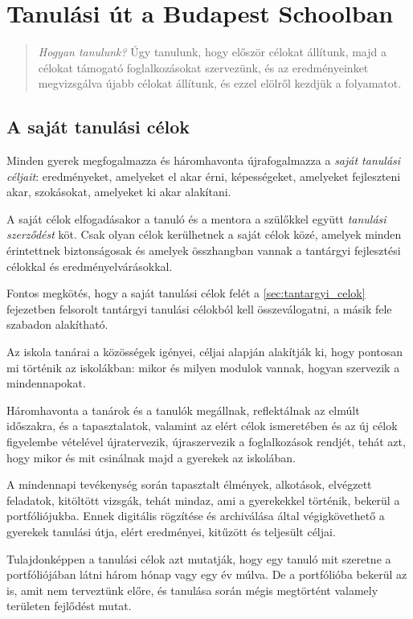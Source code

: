\chapter{Tanulási út a Budapest Schoolban}

\begin{quote}
\emph{Hogyan tanulunk?}
Úgy tanulunk, hogy először célokat állítunk, majd a célokat támogató
foglalkozásokat szervezünk, és az eredményeinket megvizsgálva újabb
célokat állítunk, és ezzel elölről kezdjük a folyamatot.
\end{quote}

\section{A saját tanulási célok}

Minden gyerek megfogalmazza és háromhavonta újrafogalmazza a \emph{saját tanulási céljait}: eredményeket, amelyeket el akar érni, képességeket, amelyeket fejleszteni akar, szokásokat, amelyeket ki akar alakítani.

A saját célok elfogadásakor a tanuló és a mentora a szülőkkel együtt \emph{tanulási szerződést} köt. Csak olyan célok kerülhetnek a saját célok közé, amelyek minden érintettnek biztonságosak és amelyek összhangban vannak a tantárgyi fejlesztési célokkal és eredményelvárásokkal.

Fontos megkötés, hogy a saját tanulási célok felét a \ref{sec:tantargyi_celok} fejezetben felsorolt tantárgyi tanulási célokból kell összeválogatni, a másik fele szabadon alakítható.

Az iskola tanárai a közösségek igényei, céljai alapján alakítják ki, hogy pontosan mi történik az iskolákban: mikor és milyen modulok vannak, hogyan szervezik a mindennapokat.

Háromhavonta a tanárok és a tanulók megállnak, reflektálnak az elmúlt időszakra, és a tapasztalatok, valamint az elért célok ismeretében és az új célok figyelembe vételével újratervezik, újraszervezik a foglalkozások rendjét, tehát azt, hogy mikor és mit csinálnak majd a gyerekek az iskolában.

A mindennapi tevékenység során tapasztalt élmények, alkotások, elvégzett feladatok, kitöltött vizsgák, tehát mindaz, ami a gyerekekkel történik, bekerül a portfóliójukba. Ennek digitális rögzítése és archiválása által végigkövethető a gyerekek tanulási útja, elért eredményei, kitűzött és teljesült céljai.

Tulajdonképpen a tanulási célok azt mutatják, hogy egy tanuló mit szeretne a portfóliójában látni három hónap vagy egy év múlva. De a portfólióba bekerül az is, amit nem terveztünk előre, és tanulása során mégis megtörtént valamely területen fejlődést mutat.

